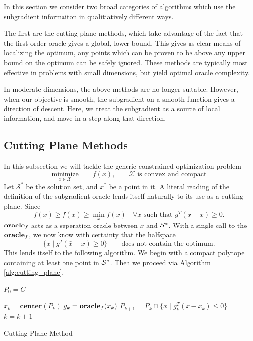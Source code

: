 In this section we consider two broad categories of algorithms which use the
subgradient informaiton in qualitiatively different ways. 

The first are the cutting plane methods, which take advantage of the fact that
the first order oracle gives a global, lower bound. This gives us clear means
of localizing the optimum, any points which can be proven to be above any
upper bound on the optimum can be safely ignored.  These methods are typically
most effective in problems with small dimensions,  but yield optimal oracle
complexity.

In moderate dimensions, the above methods are no longer suitable. However,
when our objective is smooth, the subgradient on a smooth function gives a
direction of descent. Here, we treat the subgradient as a source of local
information, and move in a step along that direction.

\subsection{Cutting Plane Methods} In this subsection we will tackle the 
generic constrained optimization problem
$$
\underset{x \in \mathcal{X}}{\mbox{minimize}}\qquad f(x), \qquad \mathcal{X} \mbox{ is convex and compact}
$$
Let $\mathcal{S}^*$ be the solution set, and $x^*$ be a point in it. A literal reading of the definition of the subgradient oracle lends itself naturally to its use as a cutting plane. Since
\[
f(\bar{x}) \geq f(x) \geq \min_x f(x)
	\quad\forall \mbox{$\bar{x}$ such that ${g^T}{(\bar{x}-x)}\geq 0$}.
\]
$\mbox{\bf oracle}_f$ acts as a seperation oracle between $x$ and $\mathcal{S^*}$.
With a single call to the $\mbox{\bf oracle}_f$, we now know with 
certainty that the halfspace
$$\{ x \mid {g^T}{(\bar{x}-x)}\geq 0 \} \qquad \mbox{does not contain
the optimum.}$$ 
This lends itself to the following algorithm. We begin with a compact
polytope containing at least one point in $\mathcal{S^*}$. Then we proceed via
Algorithm \ref{alg:cutting_plane}. 


\begin{algorithm} 
  \SetAlgoNoLine
  \DontPrintSemicolon
  $P_0 = C$\;
  
   {
  \nl $x_{k}  = \mathbf{center}(P_k)$\;
  \nl $g_k = \mbox{\bf oracle}_f(x_k)$\;
  \nl $P_{k+1} = P_k \cap \{x \mid g_k^T(x -x_k) \leq 0 \}$\;
  \nl $k = k + 1$
  }
  \caption{Cutting Plane Method \label{alg:cutting_plane}}
\end{algorithm}

